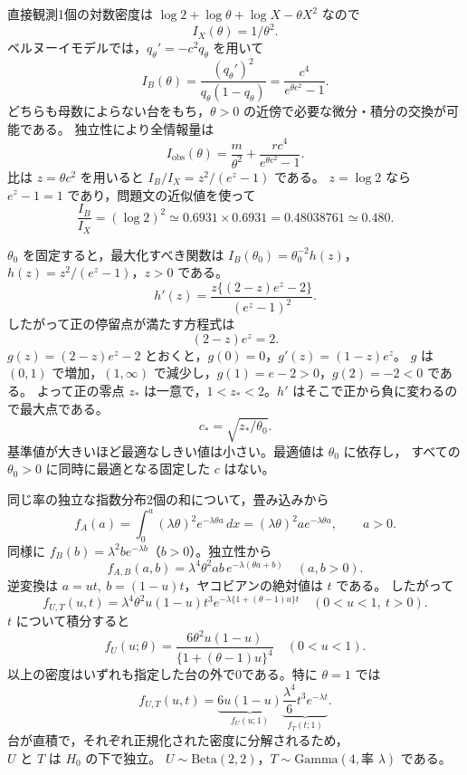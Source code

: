 \documentclass[a4paper,11pt]{ltjsarticle}
\begin{document}
直接観測1個の対数密度は $\log2+\log\theta+\log X-\theta X^2$ なので
\[
\boxed{I_X(\theta)=1/\theta^2}.
\]
ベルヌーイモデルでは，$q_\theta'=-c^2q_\theta$ を用いて
\[
I_B(\theta)=\frac{(q_\theta')^2}{q_\theta(1-q_\theta)}
=\boxed{\frac{c^4}{e^{\theta c^2}-1}}.
\]
どちらも母数によらない台をもち，$\theta>0$ の近傍で必要な微分・積分の交換が可能である。
独立性により全情報量は
\[
\boxed{I_{\mathrm{obs}}(\theta)=\frac m{\theta^2}
+\frac{r c^4}{e^{\theta c^2}-1}}.
\]
比は $z=\theta c^2$ を用いると $I_B/I_X=z^2/(e^z-1)$ である。
$z=\log2$ なら $e^z-1=1$ であり，問題文の近似値を使って
\[
\frac{I_B}{I_X}=(\log2)^2\simeq0.6931\times0.6931
=0.48038761\simeq\boxed{0.480}.
\]

$\theta_0$ を固定すると，最大化すべき関数は
$I_B(\theta_0)=\theta_0^{-2}h(z)$，$h(z)=z^2/(e^z-1)$，$z>0$ である。
\[
h'(z)=\frac{z\{(2-z)e^z-2\}}{(e^z-1)^2}.
\]
したがって正の停留点が満たす方程式は
\[
\boxed{(2-z)e^z=2}.
\]
$g(z)=(2-z)e^z-2$ とおくと，$g(0)=0$，$g'(z)=(1-z)e^z$。
$g$ は $(0,1)$ で増加，$(1,\infty)$ で減少し，$g(1)=e-2>0$，$g(2)=-2<0$ である。
よって正の零点 $z_*$ は一意で，$1<z_*<2$。$h'$ はそこで正から負に変わるので最大点である。
\[
\boxed{c_* =\sqrt{z_*/\theta_0}}.
\]
基準値が大きいほど最適なしきい値は小さい。最適値は $\theta_0$ に依存し，
すべての $\theta_0>0$ に同時に最適となる固定した $c$ はない。
\newpage

同じ率の独立な指数分布2個の和について，畳み込みから
\[
f_A(a)=\int_0^a(\lambda\theta)^2e^{-\lambda\theta a}\,dx
=(\lambda\theta)^2a e^{-\lambda\theta a},\qquad a>0.
\]
同様に $f_B(b)=\lambda^2b e^{-\lambda b}$（$b>0$）。独立性から
\[
\boxed{f_{A,B}(a,b)=\lambda^4\theta^2ab\,e^{-\lambda(\theta a+b)}
\quad(a,b>0)}.
\]
逆変換は $a=ut,\ b=(1-u)t$，ヤコビアンの絶対値は $t$ である。
したがって
\[
\boxed{f_{U,T}(u,t)=\lambda^4\theta^2u(1-u)t^3
e^{-\lambda\{1+(\theta-1)u\}t}\quad(0<u<1,\ t>0)}.
\]
$t$ について積分すると
\[
\boxed{f_U(u;\theta)=\frac{6\theta^2u(1-u)}{\{1+(\theta-1)u\}^4}
\quad(0<u<1)}.
\]
以上の密度はいずれも指定した台の外で0である。特に $\theta=1$ では
\[
f_{U,T}(u,t)=\underbrace{6u(1-u)}_{f_U(u;1)}
\underbrace{\frac{\lambda^4}{6}t^3e^{-\lambda t}}_{f_T(t;1)}.
\]
台が直積で，それぞれ正規化された密度に分解されるため，
$\boxed{U\text{ と }T\text{ は }H_0\text{ の下で独立}}$。
$U\sim\mathrm{Beta}(2,2)$，$T\sim\mathrm{Gamma}(4,\text{率 }\lambda)$ である。
\end{document}
